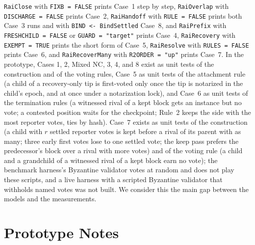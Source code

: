 \documentclass[conference]{IEEEtran}
\begin{document}
\texttt{RaiClose} with \texttt{FIXB = FALSE} prints Case~1 step by step, \texttt{RaiOverlap} with \texttt{DISCHARGE = FALSE} prints Case~2, \texttt{RaiHandoff} with \texttt{RULE = FALSE} prints both Case~3 runs and with \texttt{BIND <- BindSettled} Case~8, and \texttt{RaiPrefix} with \texttt{FRESHCHILD = FALSE} or \texttt{GUARD = "target"} prints Case~4, \texttt{RaiRecovery} with \texttt{EXEMPT = TRUE} prints the short form of Case~5, \texttt{RaiResolve} with \texttt{RULES = FALSE} prints Case~6, and \texttt{RaiRecoverMany} with \texttt{R2ORDER = "up"} prints Case~7. In the prototype, Cases 1, 2, Mixed NC, 3, 4, and 8 exist as unit tests of the construction and of the voting rules, Case~5 as unit tests of the attachment rule (a child of a recovery-only tip is first-voted only once the tip is notarized in the child's epoch, and at once under a notarization lock), and Case~6 as unit tests of the termination rules (a witnessed rival of a kept block gets an instance but no vote; a contested position waits for the checkpoint; Rule~2 keeps the side with the most reporter votes, ties by hash). Case~7 exists as unit tests of the construction (a child with $r$ settled reporter votes is kept before a rival of its parent with as many; three early first votes lose to one settled vote; the keep pass prefers the predecessor's block over a rival with more votes) and of the voting rule (a child and a grandchild of a witnessed rival of a kept block earn no vote); the benchmark harness's Byzantine validator votes at random and does not play these scripts, and a live harness with a scripted Byzantine validator that withholds named votes was not built. We consider this the main gap between the models and the measurements.

\section{Prototype Notes}
\label{app:proto}
\label{sec:eval}
\end{document}
